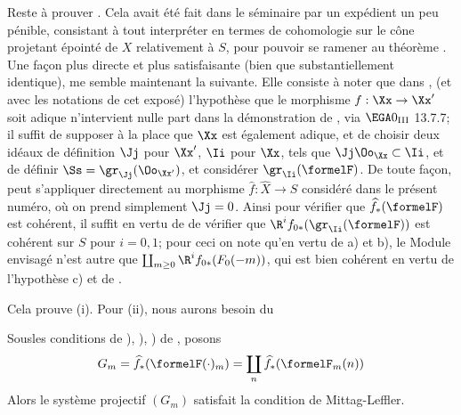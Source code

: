 Reste \`a prouver . Cela avait \'et\'e fait dans le
s\'eminaire par un exp\'edient un peu p\'enible, consistant \`a tout
interpr\'eter en termes de cohomologie sur le c\^{o}ne projetant
\'epoint\'e de $X$ relativement \`a $S$, pour pouvoir se ramener au
th\'eor\`eme . Une fa\c con plus directe et plus
satisfaisante (bien que substantiellement identique), me semble
maintenant la suivante. Elle consiste \`a noter que dans ,
\numero {}\label{XII.14} (et avec les
notations de cet expos\'e) l'hypoth\`ese que le morphisme
$f:\Xx\to\Xx'$ soit adique n'intervient nulle part dans la
d\'emonstration de , via $\EGA 0_{\textup{III}}$ 13.7.7;
il suffit de supposer \`a la place que $\Xx$ est \'egalement adique,
et de choisir deux id\'eaux de d\'efinition $\Jj$ pour $\Xx'$, $\Ii$
pour $\Xx$, tels que $\Jj\Oo_\Xx\subset\Ii$, et de d\'efinir
$\Ss=\gr_\Jj(\Oo_{\Xx'})$, et consid\'erer $\gr_\Ii(\formelF)$. De
toute fa\c con,  peut s'appliquer directement au
morphisme $\widehat{f}:\widehat{X}\to S$ consid\'er\'e dans le pr\'esent
num\'ero, o\`u on prend simplement $\Jj=0$. Ainsi pour v\'erifier que
$\widehat{f}_\ast(\formelF)$ est coh\'erent, il suffit en vertu de
\loccit de v\'erifier que $\R^if_{0\ast}(\gr_\Ii(\formelF))$ est
coh\'erent sur $S$ pour $i=0, 1$; pour ceci on note qu'en vertu de
a) et b), le Module envisag\'e n'est autre que
$\coprod_{m\geq 0}\R^if_{0\ast}(F_0(-m))$, qui
est bien coh\'erent en vertu de l'hypoth\`ese c) et de
.

Cela prouve  (i). Pour  (ii), nous aurons besoin du

\begin{lemme} \label{XII.3.3}
Sous\pageoriginaled les conditions de ), ), ) de , posons
\[
G_m= \widehat{f}_\ast(\formelF(\cdot)_m) = \coprod_n\widehat{f}_\ast(\formelF_m(n))
\]
Alors le syst\`eme projectif $(G_m)$ satisfait la condition de Mittag-Leffler.
\end{lemme}

